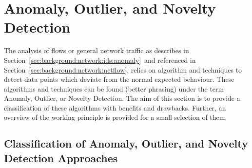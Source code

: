 \section{Anomaly, Outlier, and Novelty Detection}
\label{sec:background:network:novelty}

The analysis of flows or general network traffic as describes in Section~\ref{sec:background:network:ids:anomaly}~and referenced in Section~\ref{sec:background:network:netflow}, relies on algorithm and techniques to detect data points which deviate from the normal expected behaviour. These algorithms and techniques can be found \alert{(better phrasing)} under the term Anomaly, Outlier, or Novelty Detection.
The aim of this section is to provide a classification of these algorithms with benefits and drawbacks.
Further, an overview of the working principle is provided for a small selection of them.

\subsection[Classification of Anomaly, Outlier, and Novelty Detection]{Classification of Anomaly, Outlier, and Novelty Detection Approaches}
\label{sec:background:network:novelty:class}

